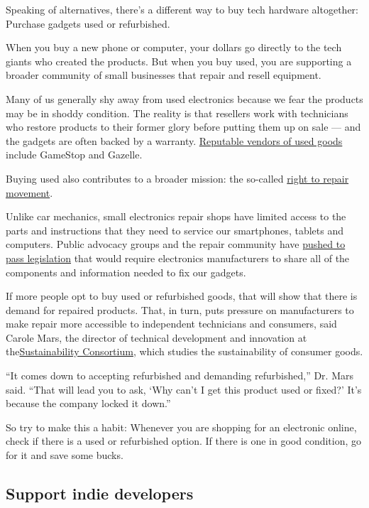 Speaking of alternatives, there's a different way to buy tech hardware
altogether: Purchase gadgets used or refurbished.

When you buy a new phone or computer, your dollars go directly to the
tech giants who created the products. But when you buy used, you are
supporting a broader community of small businesses that repair and
resell equipment.

Many of us generally shy away from used electronics because we fear the
products may be in shoddy condition. The reality is that resellers work
with technicians who restore products to their former glory before
putting them up on sale --- and the gadgets are often backed by a
warranty.
\href{https://www.nytimes3xbfgragh.onion/2016/04/28/technology/personaltech/taking-the-stigma-out-of-buying-usedelectronics.html}{Reputable
vendors of used goods} include GameStop and Gazelle.

Buying used also contributes to a broader mission: the so-called
\href{https://www.ifixit.com/Right-to-Repair/Intro}{right to repair
movement}.

Unlike car mechanics, small electronics repair shops have limited access
to the parts and instructions that they need to service our smartphones,
tablets and computers. Public advocacy groups and the repair community
have
\href{https://uspirg.org/blogs/blog/usp/right-repair-wraps-big-year}{pushed
to pass legislation} that would require electronics manufacturers to
share all of the components and information needed to fix our gadgets.

If more people opt to buy used or refurbished goods, that will show that
there is demand for repaired products. That, in turn, puts pressure on
manufacturers to make repair more accessible to independent technicians
and consumers, said Carole Mars, the director of technical development
and innovation at
the\href{https://www.sustainabilityconsortium.org/}{Sustainability
Consortium}, which studies the sustainability of consumer goods.

``It comes down to accepting refurbished and demanding refurbished,''
Dr. Mars said. ``That will lead you to ask, `Why can't I get this
product used or fixed?' It's because the company locked it down.''

So try to make this a habit: Whenever you are shopping for an electronic
online, check if there is a used or refurbished option. If there is one
in good condition, go for it and save some bucks.

\hypertarget{support-indie-developers}{%
\subsection{Support indie developers}\label{support-indie-developers}}

